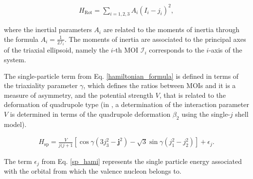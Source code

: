 \documentclass[%
 reprint,
 amsmath,
 amssymb,
 aps,
 floatfix,
]{revtex4-2}
\begin{document}
\begin{align}
    H_\text{Rot}=\sum_{i=1,2,3}A_i\left(I_i-j_i\right)^2,
\end{align}
 
 where the inertial parameters $A_i$ are related to the moments of inertia through the formula $A_i=\frac{1}{2\mathcal{I}_i}$. The moments of inertia are associated to the principal axes of the triaxial ellipsoid, namely the $i$-th MOI $\mathcal{I}_i$ corresponds to the $i$-axis of the system.

The single-particle term from Eq. \ref{hamiltonian_formula} is defined in terms of the triaxiality parameter $\gamma$, which defines the ratios between MOIs and it is a measure of asymmetry, and the potential strength $V$, that is related to the deformation of quadrupole type (in \cite{shou2009coupling}, a determination of the interaction parameter $V$ is determined in terms of the quadrupole deformation $\beta_2$ using the single-$j$ shell model).

\begin{align}
    H_\text{sp} = \frac{V}{j(j+1}\left[\cos\gamma\left(3j_3^2-\mathbf{j}^2\right)-\sqrt{3}\sin\gamma\left(j_1^2-j_2^2\right)\right]+\epsilon_j. \label{sp_hami}
\end{align}

The term $\epsilon_j$ from Eq. \ref{sp_hami} represents the single particle energy associated with the orbital from which the valence nucleon belongs to.
\end{document}
